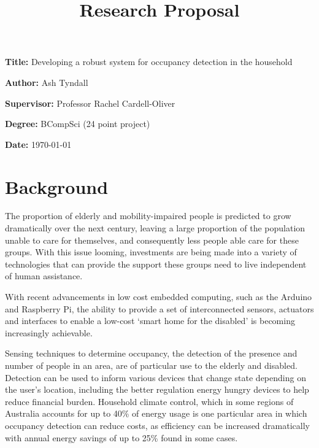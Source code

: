 \documentclass[12pt, a4paper]{article}
\title{Research Proposal}
\author{}
\date{}
\newcommand{\namelistlabel}[1]{\mbox{#1}\hfil}
\newenvironment{namelist}[1]{%
\begin{list}{}
    {
        \let\makelabel\namelistlabel
        \settowidth{\labelwidth}{#1}
        \setlength{\leftmargin}{1.1\labelwidth}
    }
  }{%
\end{list}}
\begin{document}
\maketitle

\begin{namelist}{xxxxxxxxxxxx}
\item[{\bf Title:}]
	Developing a robust system for occupancy detection in the household
\item[{\bf Author:}]
	Ash Tyndall
\item[{\bf Supervisor:}]
	Professor Rachel Cardell-Oliver
\item[{\bf Degree:}]
	BCompSci (24 point project)
\item[{\bf Date:}]
	\today
\end{namelist}

\section*{Background} 

The proportion of elderly and mobility-impaired people is predicted to grow dramatically over the next century, leaving a large proportion of the population unable to care for themselves, and consequently less people able care for these groups. \cite{chan2009smart} With this issue looming, investments are being made into a variety of technologies that can provide the support these groups need to live independent of human assistance. 

With recent advancements in low cost embedded computing, such as the Arduino \cite{Ardunio} and Raspberry Pi, \cite{RPi} the ability to provide a set of interconnected sensors, actuators and interfaces to enable a low-cost `smart home for the disabled' is becoming increasingly achievable.

Sensing techniques to determine occupancy, the detection of the presence and number of people in an area, are of particular use to the elderly and disabled. Detection can be used to inform various devices that change state depending on the user's location, including the better regulation energy hungry devices to help reduce financial burden. Household climate control, which in some regions of Australia accounts for up to 40\% of energy usage \cite{abs4602} is one particular area in which occupancy detection can reduce costs, as efficiency can be increased dramatically with annual energy savings of up to 25\% found in some cases. \cite{erickson2013thermosense}
\end{document}
